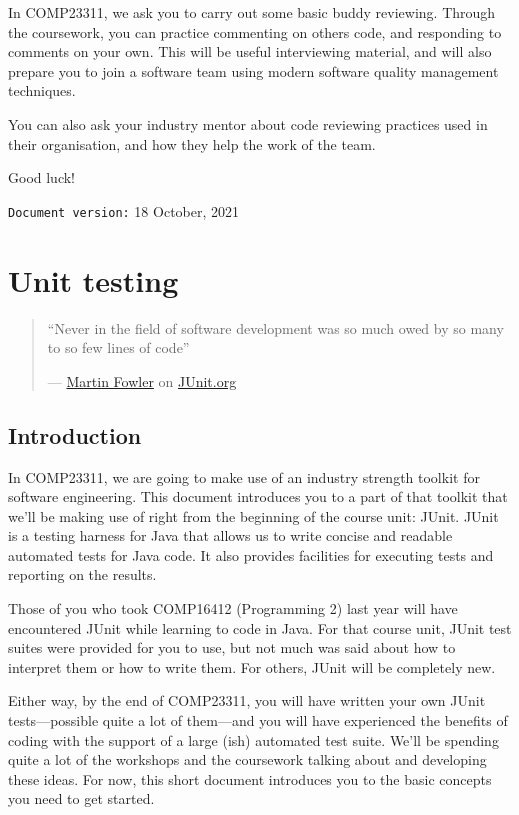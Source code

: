 \documentclass[
]{book}
\begin{document}
In COMP23311, we ask you to carry out some basic buddy reviewing. Through the coursework, you can practice commenting on others code, and responding to comments on your own. This will be useful interviewing material, and will also prepare you to join a software team using modern software quality management techniques.

You can also ask your industry mentor about code reviewing practices used in their organisation, and how they help the work of the team.

Good luck!

\texttt{Document\ version:} 18 October, 2021

\hypertarget{automating}{%
\chapter{Unit testing}\label{automating}}

\begin{quote}
``Never in the field of software development was so much owed by so many to so few lines of code''

--- \href{https://en.wikipedia.org/wiki/Martin_Fowler_(software_engineer)}{Martin Fowler} on \href{https://junit.org/}{JUnit.org}
\end{quote}

\hypertarget{jintro}{%
\section{Introduction}\label{jintro}}

In COMP23311, we are going to make use of an industry strength toolkit for software engineering. This document introduces you to a part of that toolkit that we'll be making use of right from the beginning of the course unit: JUnit. JUnit is a testing harness for Java that allows us to write concise and readable automated tests for Java code. It also provides facilities for executing tests and reporting on the results.

Those of you who took COMP16412 (Programming 2) last year will have encountered JUnit while learning to code in Java. For that course unit, JUnit test suites were provided for you to use, but not much was said about how to interpret them or how to write them. For others, JUnit will be completely new.

Either way, by the end of COMP23311, you will have written your own JUnit tests---possible quite a lot of them---and you will have experienced the benefits of coding with the support of a large (ish) automated test suite. We'll be spending quite a lot of the workshops and the coursework talking about and developing these ideas. For now, this short document introduces you to the basic concepts you need to get started.
\end{document}
